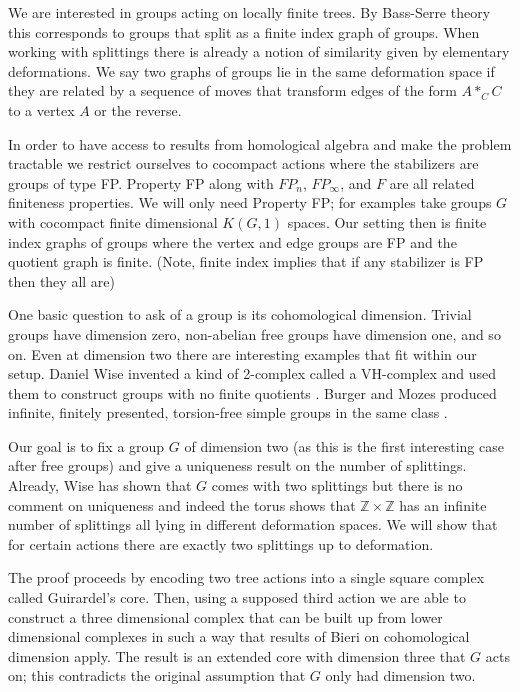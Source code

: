 \documentclass[12pt,parskip=full]{report}
\theoremstyle{plain}
\theoremstyle{definition}
\begin{document}
We are interested in groups acting on locally finite trees. By Bass-Serre theory this corresponds to groups that split as a finite index graph of groups. When working with splittings there is already a notion of similarity given by elementary deformations. We say two graphs of groups lie in the same deformation space if they are related by a sequence of moves that transform edges of the form \(A*_CC\) to a vertex \(A\) or the reverse.

In order to have access to results from homological algebra and make the problem tractable we restrict ourselves to cocompact actions where the stabilizers are groups of type FP. Property FP along with \(FP_n\), \(FP_\infty\), and \(F\) are all related finiteness properties. We will only need Property FP; for examples take groups \(G\) with cocompact finite dimensional \(K(G,1)\) spaces. Our setting then is finite index graphs of groups where the vertex and edge groups are FP and the quotient graph is finite. (Note, finite index implies that if any stabilizer is FP then they all are)

One basic question to ask of a group is its cohomological dimension. Trivial groups have dimension zero, non-abelian free groups have dimension one, and so on. Even at dimension two there are interesting examples that fit within our setup. Daniel Wise invented a kind of 2-complex called a VH-complex and used them to construct groups with no finite quotients \cite{wisethesis}. Burger and Mozes produced infinite, finitely presented, torsion-free simple groups in the same class \cite{burgermozes}.

Our goal is to fix a group \(G\) of dimension two (as this is the first interesting case after free groups) and give a uniqueness result on the number of splittings. Already, Wise has shown that \(G\) comes with two splittings but there is no comment on uniqueness and indeed the torus shows that \(\mathbb{Z}\times\mathbb{Z}\) has an infinite number of splittings all lying in different deformation spaces. We will show that for certain actions there are exactly two splittings up to deformation.

The proof proceeds by encoding two tree actions into a single square complex called Guirardel's core. Then, using a supposed third action we are able to construct a three dimensional complex that can be built up from lower dimensional complexes in such a way that results of Bieri on cohomological dimension apply. The result is an extended core with dimension three that \(G\) acts on; this contradicts the original assumption that \(G\) only had dimension two. 
\end{document}
